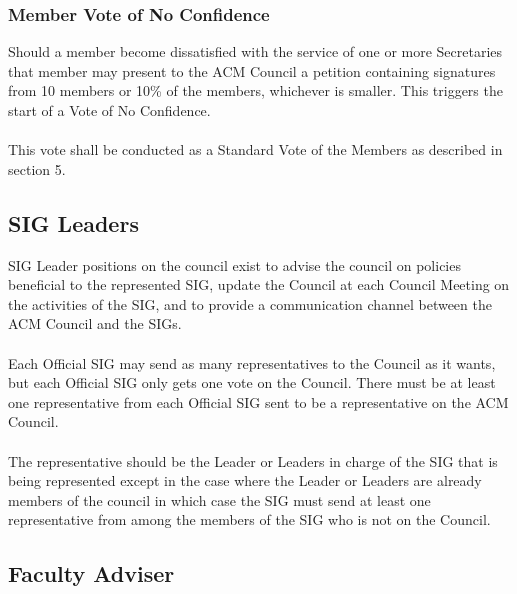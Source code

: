 \documentclass[12pt,titlepage]{article}
\begin{document}
\subsubsection{Member Vote of No Confidence}

Should a member become dissatisfied with the service of one or more Secretaries that member may present to the ACM Council a petition containing signatures from 10 members or 10\% of the members, whichever is smaller. This triggers the start of a Vote of No Confidence.\\
\\
This vote shall be conducted as a Standard Vote of the Members as described in section 5.

\subsection{SIG Leaders}

SIG Leader positions on the council exist to advise the council on policies beneficial to the represented SIG, update the Council at each Council Meeting on the activities of the SIG, and to provide a communication channel between the ACM Council and the SIGs.\\
\\
Each Official SIG may send as many representatives to the Council as it wants, but each Official SIG only gets one vote on the Council. There must be at least one representative from each Official SIG sent to be a representative on the ACM Council.\\
\\
The representative should be the Leader or Leaders in charge of the SIG that is being represented except in the case where the Leader or Leaders are already members of the council in which case the SIG must send at least one representative from among the members of the SIG who is not on the Council.

\subsection{Faculty Adviser}
\end{document}
